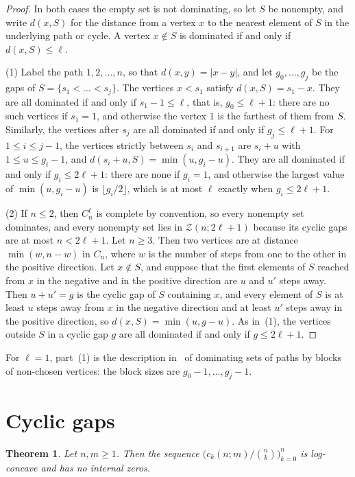 \documentclass{amsart}
\newtheorem{theorem}{Theorem}[section]
\theoremstyle{definition}
\theoremstyle{remark}
\numberwithin{equation}{section}
\newcommand{\Cyc}{\mathcal{Z}}
\begin{document}
\begin{proof}
In both cases the empty set is not dominating, so let $S$ be nonempty, and write $d(x,S)$ for the distance from a vertex $x$ to the nearest element of $S$ in the underlying path or cycle. A vertex $x\notin S$ is dominated if and only if $d(x,S)\le\ell$.

(1) Label the path $1,2,\dots,n$, so that $d(x,y)=|x-y|$, and let $g_0,\dots,g_j$ be the gaps of $S=\{s_1<\dots<s_j\}$. The vertices $x<s_1$ satisfy $d(x,S)=s_1-x$. They are all dominated if and only if $s_1-1\le\ell$, that is, $g_0\le\ell+1$: there are no such vertices if $s_1=1$, and otherwise the vertex $1$ is the farthest of them from $S$. Similarly, the vertices after $s_j$ are all dominated if and only if $g_j\le\ell+1$. For $1\le i\le j-1$, the vertices strictly between $s_i$ and $s_{i+1}$ are $s_i+u$ with $1\le u\le g_i-1$, and $d(s_i+u,S)=\min(u,g_i-u)$. They are all dominated if and only if $g_i\le2\ell+1$: there are none if $g_i=1$, and otherwise the largest value of $\min(u,g_i-u)$ is $\lfloor g_i/2\rfloor$, which is at most $\ell$ exactly when $g_i\le2\ell+1$.

(2) If $n\le2$, then $C_n^\ell$ is complete by convention, so every nonempty set dominates, and every nonempty set lies in $\Cyc(n;2\ell+1)$ because its cyclic gaps are at most $n<2\ell+1$. Let $n\ge3$. Then two vertices are at distance $\min(w,n-w)$ in $C_n$, where $w$ is the number of steps from one to the other in the positive direction. Let $x\notin S$, and suppose that the first elements of $S$ reached from $x$ in the negative and in the positive direction are $u$ and $u'$ steps away. Then $u+u'=g$ is the cyclic gap of $S$ containing $x$, and every element of $S$ is at least $u$ steps away from $x$ in the negative direction and at least $u'$ steps away in the positive direction, so $d(x,S)=\min(u,g-u)$. As in~(1), the vertices outside $S$ in a cyclic gap $g$ are all dominated if and only if $g\le2\ell+1$.
\end{proof}

For $\ell=1$, part~(1) is the description in~\cite[Section~5.1.3]{Z} of dominating sets of paths by blocks of non-chosen vertices: the block sizes are $g_0-1,\dots,g_j-1$.

\section{Cyclic gaps}\label{sec:cyclic}

\begin{theorem}\label{thm:cyclic}
Let $n,m\ge1$. Then the sequence $\bigl(c_k(n;m)/\binom nk\bigr)_{k=0}^{n}$ is log-concave and has no internal zeros.
\end{theorem}
\end{document}
